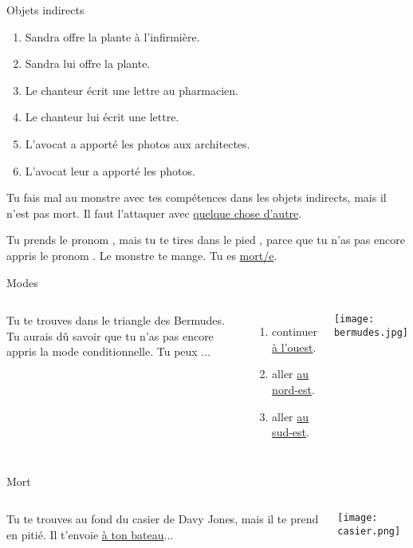 \documentclass{beamer}
\begin{document}
  \begin{frame}{Objets indirects}
    \hypertarget{indirect}{}
    \begin{enumerate}
      \item Sandra offre la plante \alert<2->{à l'infirmière}.
      \item<3->[$\to$] Sandra \alert{lui} offre la plante.
      \item<4-> Le chanteur écrit une lettre \alert<5->{au pharmacien}.
      \item<6->[$\to$] Le chanteur \alert{lui} écrit une lettre.
      \item<7-> L'avocat a apporté les photos \alert<8->{aux architectes}.
      \item<9->[$\to$] L'avocat \alert{leur} a apporté les photos.
    \end{enumerate}
    Tu fais mal  au monstre avec tes compétences dans les objets indirects, mais il n'est pas mort.
    Il faut l'attaquer avec \hyperlink{pronoms}{quelque chose d'autre}.
  \end{frame}

  \begin{frame}{}
    \hypertarget{y}{}
    Tu prends le pronom , mais tu te tires dans le pied , parce que tu n'as pas encore appris le pronom .
    Le monstre te mange.
    Tu es \hyperlink{mort}{mort/e}.
  \end{frame}

  \begin{frame}{Modes}
    \hypertarget{modes}{}
    \begin{columns}
        Tu te trouves dans le triangle des Bermudes.
        Tu \alert{aurais} dû savoir que tu n'as pas encore appris la mode conditionnelle.
        Tu peux ...
        \begin{enumerate}
          \item continuer \hyperlink{mort}{à l'ouest}.
          \item aller \hyperlink{questions}{au nord-est}.
          \item aller \hyperlink{pronoms}{au sud-est}.
        \end{enumerate}
        \begin{center}
          \texttt{[image: bermudes.jpg]}
        \end{center}
    \end{columns}
  \end{frame}

  \begin{frame}{Mort}
    \hypertarget{mort}{}
    \begin{columns}
        Tu te trouves au fond du casier de Davy Jones, mais il te prend en pitié.
        Il t'envoie \hyperlink{début}{à ton bateau}...
        \begin{center}
          \texttt{[image: casier.png]}
        \end{center}
    \end{columns}
  \end{frame}
\end{document}
